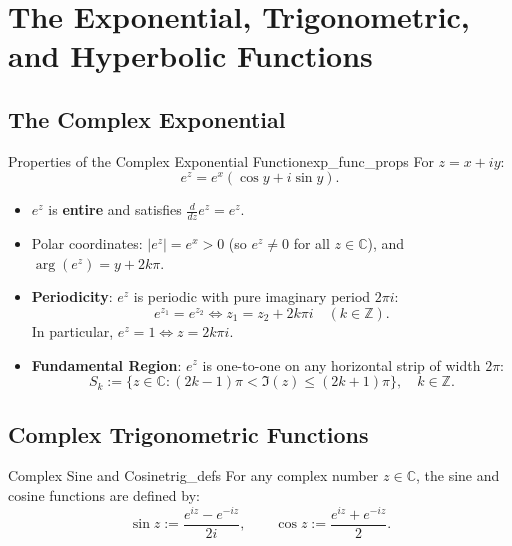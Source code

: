 \section{The Exponential, Trigonometric, and Hyperbolic Functions}

\subsection{The Complex Exponential}

\begin{proposition}{Properties of the Complex Exponential Function}{exp_func_props}
For $z = x + iy$:
\begin{equation}
e^z = e^x(\cos y + i \sin y).
\end{equation}
\begin{itemize}
    \item $e^z$ is \textbf{entire} and satisfies $\frac{d}{dz} e^z = e^z$.
    \item Polar coordinates: $|e^z| = e^x > 0$ (so $e^z \neq 0$ for all $z \in \mathbb{C}$), and $\arg(e^z) = y + 2k\pi$.
    \item \textbf{Periodicity}: $e^z$ is periodic with pure imaginary period $2\pi i$:
    \begin{equation}
    e^{z_1} = e^{z_2} \iff z_1 = z_2 + 2k\pi i \quad (k \in \mathbb{Z}).
    \end{equation}
    In particular, $e^z = 1 \iff z = 2k\pi i$.
    \item \textbf{Fundamental Region}: $e^z$ is one-to-one on any horizontal strip of width $2\pi$:
    \begin{equation}
    S_k := \{z \in \mathbb{C} : (2k - 1)\pi < \Im(z) \le (2k + 1)\pi\}, \quad k \in \mathbb{Z}.
    \end{equation}
\end{itemize}
\end{proposition}

\subsection{Complex Trigonometric Functions}

\begin{definition}{Complex Sine and Cosine}{trig_defs}
For any complex number $z \in \mathbb{C}$, the sine and cosine functions are defined by:
\begin{equation}
\sin z := \frac{e^{iz} - e^{-iz}}{2i}, \qquad \cos z := \frac{e^{iz} + e^{-iz}}{2}.
\end{equation}
\end{definition}

